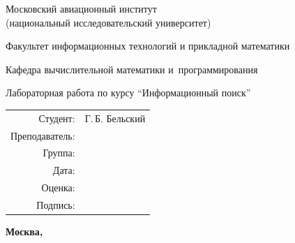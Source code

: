 \begin{titlepage}
\begin{center}
\bfseries

{\Large Московский авиационный институт\\ (национальный исследовательский университет)

}

\vspace{48pt}

{\large Факультет информационных технологий и прикладной математики
}

\vspace{36pt}

{\large Кафедра вычислительной математики и~программирования

}


\vspace{48pt}

Лабораторная работа  по курсу \enquote{Информационный поиск}

\end{center}

\vspace{72pt}

\begin{flushright}
\begin{tabular}{rl}
Студент: & Г.\,Б. Бельский \\
Преподаватель: & \\
Группа: & \\
Дата: & \\
Оценка: & \\
Подпись: & \\
\end{tabular}
\end{flushright}

\vfill

\begin{center}
\bfseries
Москва, \the\year
\end{center}
\end{titlepage}

\pagebreak
